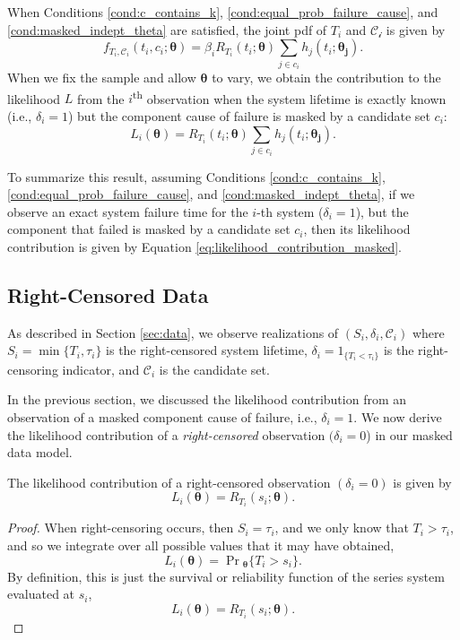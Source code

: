 \documentclass[
]{article}
\begin{document}
When Conditions \ref{cond:c_contains_k},
\ref{cond:equal_prob_failure_cause}, and \ref{cond:masked_indept_theta}
are satisfied, the joint pdf of \(T_i\) and \(\mathcal{C_i}\) is given
by \[
f_{T_i,\mathcal{C}_i}(t_i,c_i;\boldsymbol{\theta}) =
    \beta_i R_{T_i}(t_i;\boldsymbol{\theta})
    \sum_{j \in c_i} h_j(t_i;\boldsymbol{\theta_j}).
\] When we fix the sample and allow \(\boldsymbol{\theta}\) to vary, we
obtain the contribution to the likelihood \(L\) from the
\(i\)\textsuperscript{th} observation when the system lifetime is
exactly known (i.e., \(\delta_i = 1\)) but the component cause of
failure is masked by a candidate set \(c_i\): \begin{equation}
\label{eq:likelihood_contribution_masked}
L_i(\boldsymbol{\theta}) = R_{T_i}(t_i;\boldsymbol{\theta}) \sum_{j \in c_i} h_j(t_i;\boldsymbol{\theta_j}).
\end{equation}

To summarize this result, assuming Conditions \ref{cond:c_contains_k},
\ref{cond:equal_prob_failure_cause}, and \ref{cond:masked_indept_theta},
if we observe an exact system failure time for the \(i\)-th system
(\(\delta_i = 1\)), but the component that failed is masked by a
candidate set \(c_i\), then its likelihood contribution is given by
Equation \eqref{eq:likelihood_contribution_masked}.

\hypertarget{right-censored-data}{%
\subsection{Right-Censored Data}\label{right-censored-data}}

As described in Section \ref{sec:data}, we observe realizations of
\((S_i,\delta_i,\mathcal{C}_i)\) where \(S_i = \min\{T_i,\tau_i\}\) is
the right-censored system lifetime, \(\delta_i = 1_{\{T_i < \tau_i\}}\)
is the right-censoring indicator, and \(\mathcal{C}_i\) is the candidate
set.

In the previous section, we discussed the likelihood contribution from
an observation of a masked component cause of failure, i.e.,
\(\delta_i = 1\). We now derive the likelihood contribution of a
\emph{right-censored} observation \((\delta_i = 0\)) in our masked data
model.

\begin{theorem}
\label{thm:joint_s_d_c}
The likelihood contribution of a right-censored observation $(\delta_i = 0)$
is given by
\begin{equation}
L_i(\boldsymbol{\theta}) = R_{T_i}(s_i;\boldsymbol{\theta}).
\end{equation}
\end{theorem}
\begin{proof}
When right-censoring occurs, then $S_i = \tau_i$, and we only know that
$T_i > \tau_i$, and so we integrate over all possible values that it may have
obtained,
$$
L_i(\boldsymbol{\theta}) = \Pr\!{}_{\boldsymbol{\theta}}\{T_i > s_i\}.
$$
By definition, this is just the survival or reliability function of the series system
evaluated at $s_i$,
$$
L_i(\boldsymbol{\theta}) = R_{T_i}(s_i;\boldsymbol{\theta}).
$$
\end{proof}
\end{document}
